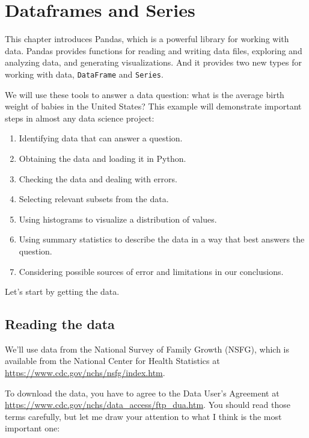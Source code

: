 \hypertarget{dataframes-and-series}{%
\chapter{Dataframes and Series}\label{dataframes-and-series}}

This chapter introduces Pandas, which is a powerful library for working
with data. Pandas provides functions for reading and writing data files,
exploring and analyzing data, and generating visualizations. And it
provides two new types for working with data,
\passthrough{\lstinline!DataFrame!} and
\passthrough{\lstinline!Series!}.

We will use these tools to answer a data question: what is the average
birth weight of babies in the United States? This example will
demonstrate important steps in almost any data science project:

\begin{enumerate}
\def\labelenumi{\arabic{enumi}.}
\item
  Identifying data that can answer a question.
\item
  Obtaining the data and loading it in Python.
\item
  Checking the data and dealing with errors.
\item
  Selecting relevant subsets from the data.
\item
  Using histograms to visualize a distribution of values.
\item
  Using summary statistics to describe the data in a way that best
  answers the question.
\item
  Considering possible sources of error and limitations in our
  conclusions.
\end{enumerate}

Let's start by getting the data.

\hypertarget{reading-the-data}{%
\section{Reading the data}\label{reading-the-data}}

We'll use data from the National Survey of Family Growth (NSFG), which
is available from the National Center for Health Statistics at
\url{https://www.cdc.gov/nchs/nsfg/index.htm}.

To download the data, you have to agree to the Data User's Agreement at
\url{https://www.cdc.gov/nchs/data_access/ftp_dua.htm}. You should read
those terms carefully, but let me draw your attention to what I think is
the most important one:

